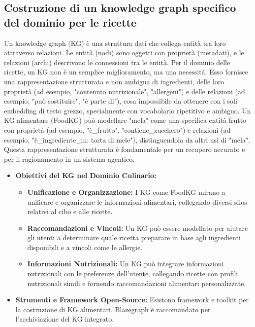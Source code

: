 \documentclass[a4paper, 11pt]{article}
\begin{document}
\subsection{Costruzione di un knowledge graph specifico del dominio per le ricette}
Un knowledge graph (KG) è una struttura dati che collega entità tra loro attraverso relazioni. \cite{understanding_kg} Le entità (nodi) sono oggetti con proprietà (metadati), e le relazioni (archi) descrivono le connessioni tra le entità. \cite{understanding_kg} Per il dominio delle ricette, un KG non è un semplice miglioramento, ma una necessità. Esso fornisce una rappresentazione strutturata e non ambigua di ingredienti, delle loro proprietà (ad esempio, "contenuto nutrizionale", "allergeni") e delle relazioni (ad esempio, "può sostituire", "è parte di"), cosa impossibile da ottenere con i soli embedding di testo grezzo, specialmente con vocabolario ripetitivo e ambiguo. Un KG alimentare (FoodKG) può modellare "mela" come una specifica entità frutto con proprietà (ad esempio, "è\_frutto", "contiene\_zucchero") e relazioni (ad esempio, "è\_ingrediente\_in: torta di mele"), distinguendola da altri usi di "mela". Questa rappresentazione strutturata \cite{understanding_kg} è fondamentale per un recupero accurato e per il ragionamento in un sistema agentico.
\begin{itemize}
    \item \textbf{Obiettivi del KG nel Dominio Culinario:}
    \begin{itemize}
        \item \textbf{Unificazione e Organizzazione:} I KG come FoodKG mirano a unificare e organizzare le informazioni alimentari, collegando diversi silos relativi al cibo e alle ricette. \cite{foodkg}
        \item \textbf{Raccomandazioni e Vincoli:} Un KG può essere modellato per aiutare gli utenti a determinare quale ricetta preparare in base agli ingredienti disponibili e a vincoli come le allergie. \cite{foodkg}
        \item \textbf{Informazioni Nutrizionali:} Un KG può integrare informazioni nutrizionali con le preferenze dell'utente, collegando ricette con profili nutrizionali simili e fornendo raccomandazioni alimentari personalizzate. \cite{nutrition_kg_recommendation}
    \end{itemize}
    \item \textbf{Strumenti e Framework Open-Source:} Esistono framework e toolkit per la costruzione di KG alimentari. \cite{foodkg} Blazegraph è raccomandato per l'archiviazione del KG integrato. \cite{foodkg}
\end{itemize}
\end{document}

